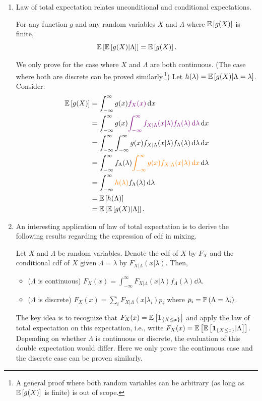 \begin{enumerate}
\item Law of total expectation relates unconditional and conditional
expectations.
\begin{theorem}
\label{thm:lote}
For any function \(g\) and any random variables \(X\) and \(\Lambda\) where
\(\mathbb{E}\left[g(X)\right]\) is finite,
\[
\mathbb{E}\left[\mathbb{E}\left[g(X)|\Lambda\right]\right]=\mathbb{E}\left[g(X)\right].
\]
\end{theorem}
\begin{pf}
We only prove for the case where \(X\) and \(\Lambda\) are both continuous.
(The case where both are discrete can be proved similarly.\footnote{A general proof
where both random variables can be arbitrary (as long as \(\mathbb{E}\left[g(X)\right]\) is
finite) is out of scope.}) Let \(h(\lambda)=\mathbb{E}\left[g(X)|\Lambda=\lambda\right]\).
Consider:
\begin{align*}
\mathbb{E}\left[g(X)\right]&=\int_{-\infty}^{\infty}g(x){\color{violet}f_{X}(x)}\dd{x}\\
&=\int_{-\infty}^{\infty}g(x){\color{violet}\int_{-\infty}^{\infty}
f_{X|\Lambda}(x|\lambda)f_{\Lambda}(\lambda)\dd{\lambda}}\dd{x}\\
&=\int_{-\infty}^{\infty}\int_{-\infty}^{\infty}
g(x)f_{X|\Lambda}(x|\lambda)f_{\Lambda}(\lambda)\dd{\lambda}\dd{x}\\
&=\int_{-\infty}^{\infty}f_{\Lambda}(\lambda){\color{orange}\int_{-\infty}^{\infty}
g(x)f_{X|\Lambda}(x|\lambda)\dd{x}}\dd{\lambda}\\
&=\int_{-\infty}^{\infty}{\color{orange}h(\lambda)}f_{\Lambda}(\lambda)\dd{\lambda}\\
&=\mathbb{E}\left[h(\Lambda)\right]\\
&=\mathbb{E}\left[\mathbb{E}\left[g(X)|\Lambda\right]\right].
\end{align*}
\end{pf}

\item An interesting application of law of total expectation is to derive the
following results regarding the expression of cdf in mixing.
\begin{proposition}
\label{prp:mixing-cdf}
Let \(X\) and \(\Lambda\) be random variables. Denote the cdf of \(X\) by
\(F_X\) and the conditional cdf of \(X\) given \(\Lambda=\lambda\) by
\(F_{X|\Lambda}(x|\lambda)\). Then,
\begin{itemize}
\item (\(\Lambda\) is continuous)
\(\displaystyle F_X(x)=\int_{-\infty}^{\infty}F_{X|\Lambda}(x|\lambda)f_{\Lambda}(\lambda)\dd{\lambda}.\)
\item (\(\Lambda\) is discrete) \(\displaystyle
F_X(x)=\sum_{i}^{}F_{X|\Lambda}(x|\lambda_i)p_i\) where
\(p_i=\mathbb{P}\left(\Lambda=\lambda_i\right)\).
\end{itemize}
\end{proposition}
\begin{pf}
The key idea is to recognize that \(F_X(x)=\mathbb{E}\left[\mathbf{1}_{\left\{X\le x\right\}}\right]\) and apply
the law of total expectation on this expectation, i.e., write
\(F_X(x)=\mathbb{E}\left[\mathbb{E}\left[\mathbf{1}_{\left\{X\le x\right\}}|\Lambda\right]\right]\). Depending on whether
\(\Lambda\) is continuous or discrete, the evaluation of this double
expectation would differ. Here we only prove the continuous case and the
discrete case can be proven similarly.


\end{pf}
\end{enumerate}
